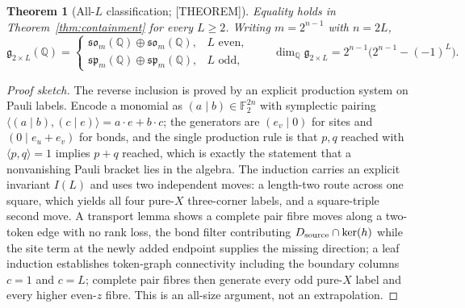 \documentclass[11pt]{article}
\newtheorem{theorem}{Theorem}[section]
\theoremstyle{definition}
\newcommand{\Qb}{\mathbb{Q}}
\newcommand{\Fb}{\mathbb{F}}
\newcommand{\alg}{\mathfrak{g}}
\begin{document}
\begin{theorem}[All-$L$ classification; {[THEOREM]}]\label{thm:altern}
Equality holds in Theorem~\ref{thm:containment} for \emph{every} $L\ge2$. Writing $m=2^{n-1}$ with
$n=2L$,
\[
\alg_{2\times L}(\Qb)=
\begin{cases}
\mathfrak{so}_m(\Qb)\oplus\mathfrak{so}_m(\Qb), & L\text{ even},\\[2pt]
\mathfrak{sp}_m(\Qb)\oplus\mathfrak{sp}_m(\Qb), & L\text{ odd},
\end{cases}
\qquad
\dim_\Qb\alg_{2\times L}=2^{n-1}\bigl(2^{n-1}-(-1)^L\bigr).
\]
\end{theorem}

\begin{proof}[Proof sketch]
The reverse inclusion is proved by an explicit production system on Pauli labels. Encode a monomial
as $(a\mid b)\in\Fb_2^{2n}$ with symplectic pairing $\langle(a\mid b),(c\mid e)\rangle=a\cdot e+
b\cdot c$; the generators are $(e_v\mid0)$ for sites and $(0\mid e_u+e_v)$ for bonds, and the single
production rule is that $p,q$ reached with $\langle p,q\rangle=1$ implies $p+q$ reached, which is
exactly the statement that a nonvanishing Pauli bracket lies in the algebra. The induction carries an
explicit invariant $I(L)$ and uses two independent moves: a length-two route across one square, which
yields all four pure-$X$ three-corner labels, and a square-triple second move. A transport lemma
shows a complete pair fibre moves along a two-token edge with no rank loss, the bond filter
contributing $D_{\rm source}\cap\ker(h)$ while the site term at the newly added endpoint supplies the
missing direction; a leaf induction establishes token-graph connectivity including the boundary
columns $c=1$ and $c=L$; complete pair fibres then generate every odd pure-$X$ label and every
higher even-$z$ fibre. This is an all-size argument, not an extrapolation.
\end{proof}
\end{document}
